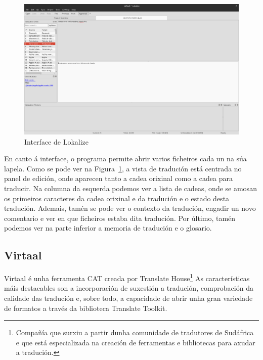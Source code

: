 \begin{figure}[h]
    \centering
    \includegraphics[width=\textwidth]{img/captura_lokalize.png}
    \caption{Interface de Lokalize}
    \label{fig:lokalize}
\end{figure}

En canto á interface, o programa permite abrir varios ficheiros cada un na súa lapela. Como se pode ver na Figura~\ref{fig:lokalize}, a vista de tradución está centrada no panel de edición, onde aparecen tanto a cadea orixinal como a cadea para traducir. Na columna da esquerda podemos ver a lista de cadeas, onde se amosan os primeiros caracteres da cadea orixinal e da tradución e o estado desta tradución. Ademais, tamén se pode ver o contexto da tradución, engadir un novo comentario e ver en que ficheiros estaba dita tradución. Por último, tamén podemos ver na parte inferior a memoria de tradución e o glosario.

\subsection{Virtaal}

Virtaal é unha ferramenta CAT\cite{website:virtaalweb} creada por Translate House\footnote{Compañía que surxiu a partir dunha comunidade de tradutores de Sudáfrica e que está especializada na creación de ferramentas e bibliotecas para axudar a tradución.} As características máis destacables son a incorporación de suxestión a tradución, comprobación da calidade das tradución e, sobre todo, a capacidade de abrir unha gran variedade de formatos a través da biblioteca Translate Toolkit.

